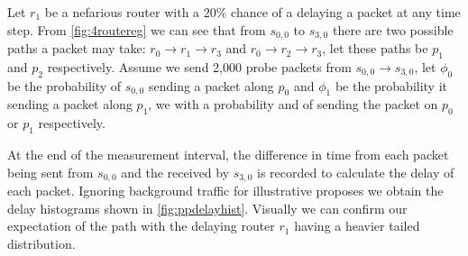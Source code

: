 Let $r_1$ be a nefarious router with a $20\%$ chance of a delaying a packet at any time step. From \ref{fig:4routereg} we can see that from $s_{0,0}$ to $s_{3,0}$ there are two possible paths a packet may take: $r_0\rightarrow r_1\rightarrow r_3$ and $r_0\rightarrow r_2\rightarrow r_3$, let these paths be $p_1$ and $p_2$ respectively. Assume we send 2,000 probe packets from $s_{0,0}\rightarrow s_{3,0}$, let $\phi_0$ be the probability of $s_{0,0}$ sending a packet along $p_0$ and $\phi_1$ be the probability it sending a packet along $p_1$, we with a probability and  of sending the packet on $p_0$ or $p_1$ respectively.\par
At the end of the measurement interval, the difference in time from each packet being sent from $s_{0,0}$ and the received by $s_{3,0}$ is recorded to calculate the delay of each packet. Ignoring background traffic for illustrative proposes we obtain the delay histograms shown in \cref{fig:ppdelayhist}. Visually we can confirm our expectation of the path with the delaying router $r_1$ having a heavier tailed distribution.\par
